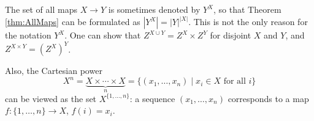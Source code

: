 \begin{rem}
The set of all maps $X \to Y$ is sometimes denoted by $Y^X$, so that Theorem \ref{thm:AllMaps} can be formulated as $\left|Y^X\right| = |Y|^{|X|}$.
This is not the only reason for the notation $Y^X$.
One can show that $Z^{X \cup Y} = Z^X \times Z^Y$ for disjoint $X$ and $Y$, and $Z^{X \times Y} = (Z^X)^Y$.

Also, the Cartesian power
\[
X^n = \underbrace{X \times \cdots \times X}_{n} = \{(x_1, \ldots, x_n) \mid x_i \in X \text{ for all }i\}
\]
can be viewed as the set $X^{\{1, \ldots, n\}}$:
a sequence $(x_1, \ldots, x_n)$ corresponds to a map $f \colon \{1, \ldots, n\} \to X$, $f(i) = x_i$.
\end{rem}